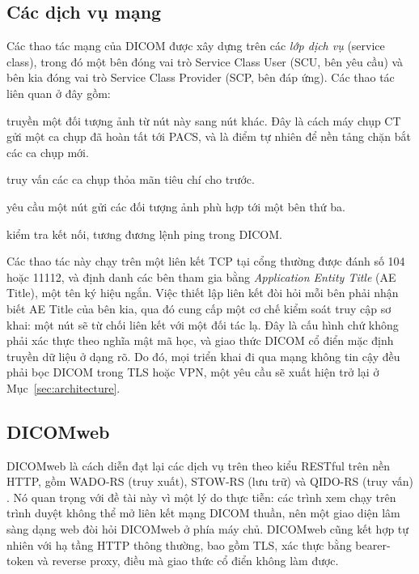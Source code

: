 \subsection{Các dịch vụ mạng}

Các thao tác mạng của DICOM được xây dựng trên các \emph{lớp dịch vụ} (service
class), trong đó một bên đóng vai trò Service Class User (SCU, bên yêu cầu) và
bên kia đóng vai trò Service Class Provider (SCP, bên đáp ứng). Các thao tác
liên quan ở đây gồm:

\begin{description}[leftmargin=2.2cm,style=nextline]
    \item[C-STORE] truyền một đối tượng ảnh từ nút này sang nút khác. Đây là cách
          máy chụp CT gửi một ca chụp đã hoàn tất tới PACS, và là điểm tự nhiên
          để nền tảng chặn bắt các ca chụp mới.
    \item[C-FIND] truy vấn các ca chụp thỏa mãn tiêu chí cho trước.
    \item[C-MOVE] yêu cầu một nút gửi các đối tượng ảnh phù hợp tới một bên thứ ba.
    \item[C-ECHO] kiểm tra kết nối, tương đương lệnh ping trong DICOM.
\end{description}

Các thao tác này chạy trên một liên kết TCP tại cổng thường được đánh số 104 hoặc
11112, và định danh các bên tham gia bằng \emph{Application Entity Title} (AE
Title), một tên ký hiệu ngắn. Việc thiết lập liên kết đòi hỏi mỗi bên phải nhận
biết AE Title của bên kia, qua đó cung cấp một cơ chế kiểm soát truy cập sơ khai:
một nút sẽ từ chối liên kết với một đối tác lạ. Đây là cấu hình chứ không phải
xác thực theo nghĩa mật mã học, và giao thức DICOM cổ điển mặc định truyền dữ
liệu ở dạng rõ. Do đó, mọi triển khai đi qua mạng không tin cậy đều phải bọc
DICOM trong TLS hoặc VPN, một yêu cầu sẽ xuất hiện trở lại ở
Mục~\ref{sec:architecture}.

\subsection{DICOMweb}

DICOMweb là cách diễn đạt lại các dịch vụ trên theo kiểu RESTful trên nền HTTP,
gồm WADO-RS (truy xuất), STOW-RS (lưu trữ) và QIDO-RS (truy vấn) \cite{dicomweb}. Nó quan trọng
với đề tài này vì một lý do thực tiễn: các trình xem chạy trên trình duyệt không
thể mở liên kết mạng DICOM thuần, nên một giao diện lâm sàng dạng web đòi hỏi
DICOMweb ở phía máy chủ. DICOMweb cũng kết hợp tự nhiên với hạ tầng HTTP thông
thường, bao gồm TLS, xác thực bằng bearer-token và reverse proxy, điều mà giao
thức cổ điển không làm được.

